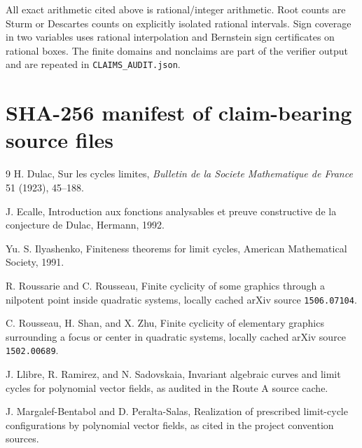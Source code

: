\documentclass[11pt]{article}
\begin{document}
All exact arithmetic cited above is rational/integer arithmetic.  Root counts are Sturm or Descartes counts on explicitly isolated rational intervals.  Sign coverage in two variables uses rational interpolation and Bernstein sign certificates on rational boxes.  The finite domains and nonclaims are part of the verifier output and are repeated in \texttt{CLAIMS\_AUDIT.json}.

\section{SHA-256 manifest of claim-bearing source files}

\begin{thebibliography}{9}
H. Dulac, Sur les cycles limites, \emph{Bulletin de la Societe Mathematique de France} 51 (1923), 45--188.

J. Ecalle, Introduction aux fonctions analysables et preuve constructive de la conjecture de Dulac, Hermann, 1992.

Yu. S. Ilyashenko, Finiteness theorems for limit cycles, American Mathematical Society, 1991.

R. Roussarie and C. Rousseau, Finite cyclicity of some graphics through a nilpotent point inside quadratic systems, locally cached arXiv source \texttt{1506.07104}.

C. Rousseau, H. Shan, and X. Zhu, Finite cyclicity of elementary graphics surrounding a focus or center in quadratic systems, locally cached arXiv source \texttt{1502.00689}.

J. Llibre, R. Ramirez, and N. Sadovskaia, Invariant algebraic curves and limit cycles for polynomial vector fields, as audited in the Route A source cache.

J. Margalef-Bentabol and D. Peralta-Salas, Realization of prescribed limit-cycle configurations by polynomial vector fields, as cited in the project convention sources.
\end{thebibliography}
\end{document}
